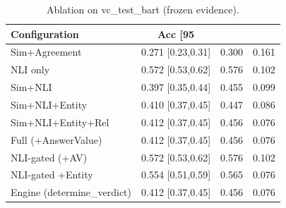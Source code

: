 \begin{table}[t]
\centering
\caption{Ablation on vc_test_bart (frozen evidence).}
\label{tab:ablation_vc_test_bart}
\small
\begin{tabular}{lccc}
\hline
Configuration & Acc [95\\%
\hline
Sim+Agreement & 0.271 [0.23,0.31] & 0.300 & 0.161 \\
NLI only & 0.572 [0.53,0.62] & 0.576 & 0.102 \\
Sim+NLI & 0.397 [0.35,0.44] & 0.455 & 0.099 \\
Sim+NLI+Entity & 0.410 [0.37,0.45] & 0.447 & 0.086 \\
Sim+NLI+Entity+Rel & 0.412 [0.37,0.45] & 0.456 & 0.076 \\
Full (+AnswerValue) & 0.412 [0.37,0.45] & 0.456 & 0.076 \\
NLI-gated (+AV) & 0.572 [0.53,0.62] & 0.576 & 0.102 \\
NLI-gated +Entity & 0.554 [0.51,0.59] & 0.565 & 0.076 \\
Engine (determine\_verdict) & 0.412 [0.37,0.45] & 0.456 & 0.076 \\
\hline
\end{tabular}
\end{table}